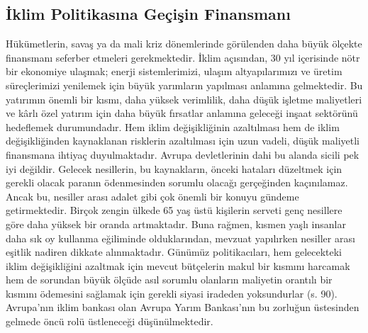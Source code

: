 \documentclass[
]{book}
\begin{document}
\hypertarget{iklim-politikasux131na-geuxe7iux15fin-finansmanux131}{%
\subsection{İklim Politikasına Geçişin Finansmanı}\label{iklim-politikasux131na-geuxe7iux15fin-finansmanux131}}

Hükümetlerin, savaş ya da mali kriz dönemlerinde görülenden daha büyük ölçekte finansmanı seferber etmeleri gerekmektedir. İklim açısından, 30 yıl içerisinde nötr bir ekonomiye ulaşmak; enerji sistemlerimizi, ulaşım altyapılarımızı ve üretim süreçlerimizi yenilemek için büyük yarımların yapılması anlamına gelmektedir. Bu yatırımın önemli bir kısmı, daha yüksek verimlilik, daha düşük işletme maliyetleri ve kârlı özel yatırım için daha büyük fırsatlar anlamına geleceği inşaat sektörünü hedeflemek durumundadır. Hem iklim değişikliğinin azaltılması hem de iklim değişikliğinden kaynaklanan risklerin azaltılması için uzun vadeli, düşük maliyetli finansmana ihtiyaç duyulmaktadır. Avrupa devletlerinin dahi bu alanda sicili pek iyi değildir. Gelecek nesillerin, bu kaynakların, önceki hataları düzeltmek için gerekli olacak paranın ödenmesinden sorumlu olacağı gerçeğinden kaçınılamaz. Ancak bu, nesiller arası adalet gibi çok önemli bir konuyu gündeme getirmektedir. Birçok zengin ülkede 65 yaş üstü kişilerin serveti genç nesillere göre daha yüksek bir oranda artmaktadır. Buna rağmen, kısmen yaşlı insanlar daha sık oy kullanma eğiliminde olduklarından, mevzuat yapılırken nesiller arası eşitlik nadiren dikkate alınmaktadır. Günümüz politikacıları, hem gelecekteki iklim değişikliğini azaltmak için mevcut bütçelerin makul bir kısmını harcamak hem de sorundan büyük ölçüde asıl sorumlu olanların maliyetin orantılı bir kısmını ödemesini sağlamak için gerekli siyasi iradeden yoksundurlar (s. 90). \citep{ponthieu2019climate} Avrupa'nın iklim bankası olan Avrupa Yarım Bankası'nın bu zorluğun üstesinden gelmede öncü rolü üstleneceği düşünülmektedir.
\end{document}
